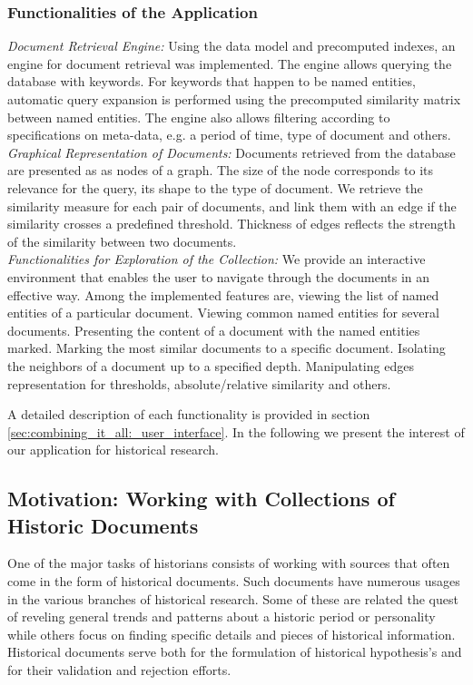 \subsubsection{Functionalities of the Application}

\emph{Document Retrieval Engine:} Using the data model and precomputed indexes, an engine for document retrieval was implemented. The engine allows querying the database with keywords. For keywords that happen to be named entities, automatic query expansion is performed using the precomputed similarity matrix between named entities.  The engine also allows filtering according to specifications on meta-data, e.g. a period of time, type of document and others.\\ 
\emph{Graphical Representation of Documents:} Documents retrieved from the database are presented as as nodes of a graph. The size of the node corresponds to its relevance for the query, its shape to the type of document.  We retrieve the similarity measure for each pair of documents, and link them with an edge if the similarity crosses a predefined threshold. Thickness of edges reflects the strength of the similarity between two documents.\\
\emph{Functionalities for Exploration of the Collection:} We provide an interactive environment that enables the user to navigate through the documents in an effective way. Among the implemented features are, viewing the list of named entities of a particular document. Viewing common named entities for several documents. Presenting the content of a document with the named entities marked. Marking the most similar documents to a specific document. Isolating the neighbors of a document up to a specified depth. Manipulating edges representation for thresholds, absolute/relative similarity and others.

A detailed description of each functionality is provided in section \ref{sec:combining_it_all:_user_interface}. In the following we present the interest of our application for historical research. 

\subsection{Motivation: Working with Collections of Historic Documents}
\label{sec:motivation}
One of the major tasks of historians consists of working with sources that often come in the form of historical documents. Such documents have numerous usages in the various branches of historical research. Some of these are related the quest of reveling general trends and patterns about a historic period or personality while others focus on finding specific details and pieces of historical information. Historical documents serve both for the formulation of historical hypothesis's and for their validation and rejection efforts. 

